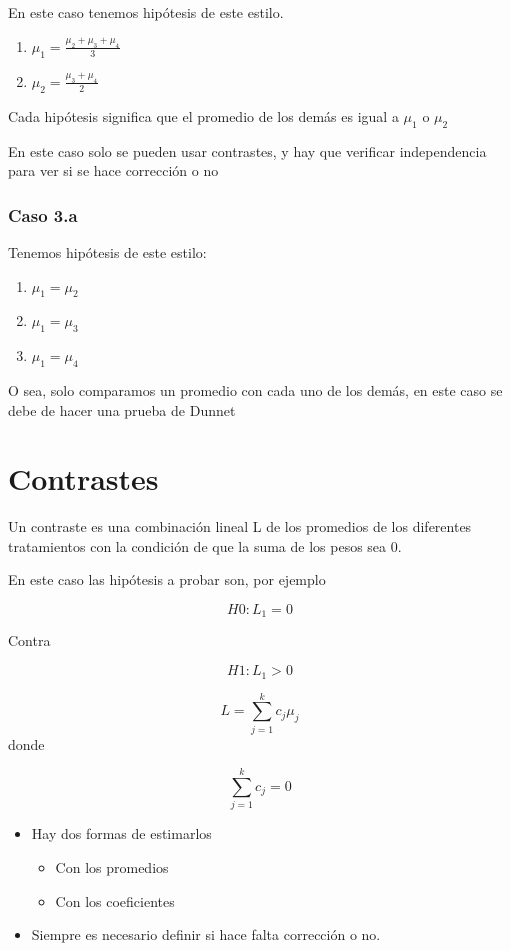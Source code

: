 \documentclass[
]{article}
\providecommand{\tightlist}{%
  \setlength{\itemsep}{0pt}\setlength{\parskip}{0pt}}
\begin{document}
En este caso tenemos hipótesis de este estilo.

\begin{enumerate}
\def\labelenumi{\arabic{enumi}.}
\item
  \(\mu_1=\frac{\mu_2+\mu_3+\mu_4}{3}\)
\item
  \(\mu_2=\frac{\mu_3+\mu_4}{2}\)
\end{enumerate}

Cada hipótesis significa que el promedio de los demás es igual a
\(\mu_1\) o \(\mu_2\)

En este caso solo se pueden usar contrastes, y hay que verificar
independencia para ver si se hace corrección o no

\subsubsection{Caso 3.a}\label{caso-3.a}

Tenemos hipótesis de este estilo:

\begin{enumerate}
\def\labelenumi{\arabic{enumi}.}
\tightlist
\item
  \(\mu_1=\mu_2\)
\item
  \(\mu_1=\mu_3\)
\item
  \(\mu_1=\mu_4\)
\end{enumerate}

O sea, solo comparamos un promedio con cada uno de los demás, en este
caso se debe de hacer una prueba de Dunnet

\section{Contrastes}\label{contrastes}

Un contraste es una combinación lineal L de los promedios de los
diferentes tratamientos con la condición de que la suma de los pesos sea
0.

En este caso las hipótesis a probar son, por ejemplo

\[
H0: L_1=0
\]

Contra

\[
H1: L_1 > 0
\]

\[
L=\sum_{j=1}^k c_j\mu_j
\] donde

\[
\sum_{j=1}^k c_j=0
\]

\begin{itemize}
\tightlist
\item
  Hay dos formas de estimarlos

  \begin{itemize}
  \tightlist
  \item
    Con los promedios
  \item
    Con los coeficientes
  \end{itemize}
\item
  Siempre es necesario definir si hace falta corrección o no.
\end{itemize}
\end{document}
